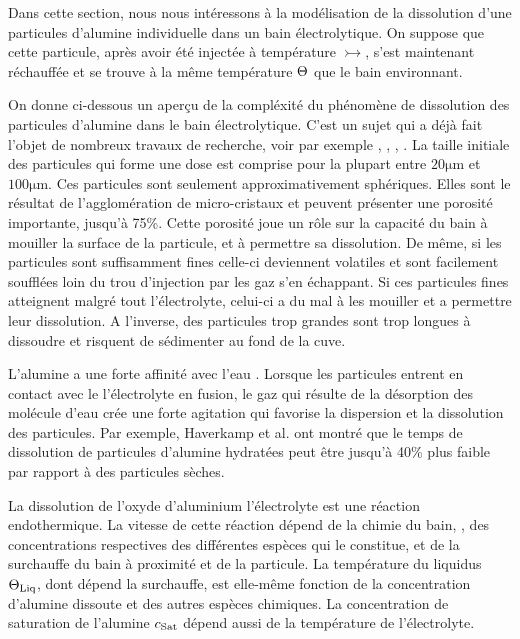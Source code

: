 Dans cette section, nous nous intéressons à la modélisation de
la dissolution d'une particules d'alumine individuelle dans un bain
électrolytique. On suppose que cette particule, après avoir été
injectée à température $\tinj$, s'est maintenant réchauffée et se
trouve à la même température $\Theta$ que le bain environnant.

On donne ci-dessous un aperçu de la compléxité du phénomène de
dissolution des particules d'alumine dans le bain
électrolytique. C'est un sujet qui a déjà fait l'objet de nombreux
travaux de recherche, voir par exemple \cite{Dassylva2015},
\cite{Kvande1986}, \cite{Gerlach1975}, \cite{Solheim1995}. La
taille initiale des particules qui forme une dose est comprise pour la
plupart entre $\num{20}\si{\micro\meter}$ et
$\num{100}\si{\micro\meter}$. Ces particules sont seulement
approximativement sphériques. Elles sont le résultat de
l'agglomération de micro-cristaux et peuvent présenter une porosité
importante, jusqu'à \num{75}\%. Cette porosité joue un rôle sur la
capacité du bain à mouiller la surface de la particule, et à permettre
sa dissolution. De même, si les particules sont suffisamment fines
celle-ci deviennent volatiles et sont facilement soufflées loin du
trou d'injection par les gaz s'en échappant. Si ces particules fines
atteignent malgré tout l'électrolyte, celui-ci a du mal à les mouiller
et a permettre leur dissolution. A l'inverse, des particules trop
grandes sont trop longues à dissoudre et risquent de sédimenter au
fond de la cuve.

L'alumine a une forte affinité avec l'eau
\cite{Patterson2001}. Lorsque les particules entrent en contact avec
le l'électrolyte en fusion, le gaz qui résulte de la désorption des
molécule d'eau crée une forte agitation qui favorise la dispersion et
la dissolution des particules. Par exemple, Haverkamp et
al. \cite{Haverkamp1994} ont montré que le temps de dissolution de
particules d'alumine hydratées peut être jusqu'à \num{40}\% plus
faible par rapport à des particules sèches.

La dissolution de l'oxyde d'aluminium l'électrolyte est une réaction
endothermique. La vitesse de cette réaction dépend de la chimie du
bain, \ie, des concentrations respectives des différentes espèces qui
le constitue, et de la surchauffe du bain à proximité et de la
particule. La température du liquidus $\Theta_\text{Liq}$, dont dépend la
surchauffe, est elle-même fonction de la concentration d'alumine
dissoute et des autres espèces chimiques. La concentration de
saturation de l'alumine $c_\text{Sat}$ dépend aussi de la température de
l'électrolyte.


